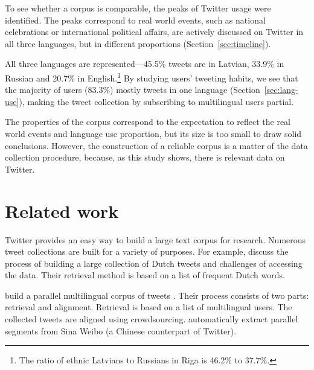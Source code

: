 \documentclass[11pt,a4paper]{article}
\begin{document}
To see whether a corpus is comparable, the peaks of Twitter usage were identified. The peaks correspond to real world events, such as national celebrations or international political affairs, are actively discussed on Twitter in all three languages, but in different proportions (Section~\ref{sec:timeline}).

All three languages are represented---45.5\% tweets are in Latvian, 33.9\% in Russian and 20.7\% in English.\footnote{
The ratio of ethnic Latvians to Russians in Riga is 46.2\% to 37.7\%.}
By studying users' tweeting habits, we see that the majority of users (83.3\%) mostly tweets in one language (Section~\ref{sec:lang-use}), making the tweet collection by subscribing to multilingual users partial.

The properties of the corpus correspond to the expectation to reflect the real world events and language use proportion, but its size is too small to draw solid conclusions. However, the construction of a reliable corpus is a matter of the data collection procedure, because, as this study shows, there is relevant data on Twitter.


\section{Related work}

Twitter %
provides an easy way to build a large text corpus for research. Numerous tweet collections are built for a variety of purposes. For example, \citet{sang2013} discuss the process of building a large collection of Dutch tweets and challenges of accessing the data. %
Their retrieval method is based on a list of frequent Dutch words.

\citet{SANVICENTE16.465} build a parallel multilingual corpus of tweets%
. Their process consists of two parts: retrieval and alignment. Retrieval is based on a list of multilingual users. The collected tweets are aligned using crowdsourcing. \citet{ling-EtAl:2013:ACL2013} automatically extract parallel segments from Sina Weibo (a Chinese counterpart of Twitter).
\end{document}
